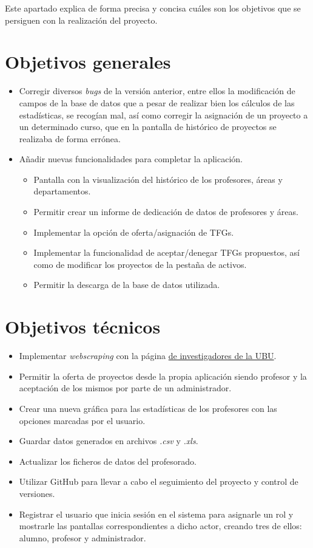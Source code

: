 
Este apartado explica de forma precisa y concisa cuáles son los objetivos que se persiguen con la realización del proyecto.

\section{Objetivos generales}
\begin{itemize}
	\item Corregir diversos \emph{bugs} de la versión anterior, entre ellos la modificación de campos de la base de datos que a pesar de realizar bien los cálculos de las estadísticas, se recogían mal, así como corregir la asignación de un proyecto a un determinado curso, que en la pantalla de histórico de proyectos se realizaba de forma errónea.
	\item Añadir nuevas funcionalidades para completar la aplicación.
		\begin{itemize}
			\item Pantalla con la visualización del histórico de los profesores, áreas y departamentos.
			\item Permitir crear un informe de dedicación de datos de profesores y áreas.
			\item Implementar la opción de oferta/asignación de TFGs.
			\item Implementar la funcionalidad de aceptar/denegar TFGs propuestos, así como de modificar los proyectos de la pestaña de activos.
			\item Permitir la descarga de la base de datos utilizada.
			
		\end{itemize}

	
\end{itemize}
\section{Objetivos técnicos}
\begin{itemize}
	\item Implementar \emph{webscraping} con la página \href{https://investigacion.ubu.es/unidades/2682/investigadores}{de investigadores de la UBU}.
	\item Permitir la oferta de proyectos desde la propia aplicación siendo profesor y la aceptación de los mismos por parte de un administrador.
	\item Crear una nueva gráfica para las estadísticas de los profesores con las opciones marcadas por el usuario.
	\item Guardar datos generados en archivos \emph{.csv} y \emph{.xls}.
	\item Actualizar los ficheros de datos del profesorado.
	\item Utilizar GitHub para llevar a cabo el seguimiento del proyecto y control de versiones.
	\item Registrar el usuario que inicia sesión en el sistema para asignarle un rol y mostrarle las pantallas correspondientes a dicho actor, creando tres de ellos: alumno, profesor y administrador.
\end{itemize}